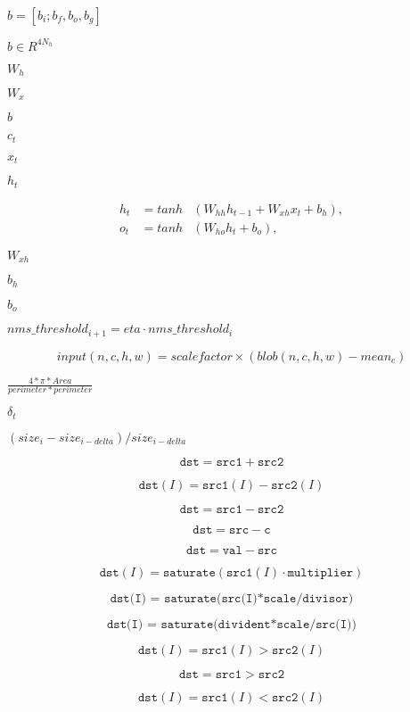 \documentclass{article}
\begin{document}
$ b = [b_i; b_f, b_o, b_g]$
\pagebreak

$b \in R^{4N_h} $
\pagebreak

$ W_h $
\pagebreak

$ W_x $
\pagebreak

$ b $
\pagebreak

$ c_t $
\pagebreak

$ x_t $
\pagebreak

$ h_t $
\pagebreak

\begin{eqnarray*} h_t &= tanh&(W_{hh} h_{t-1} + W_{xh} x_t + b_h), \\ o_t &= tanh&(W_{ho} h_t + b_o), \end{eqnarray*}
\pagebreak

$ W_{xh} $
\pagebreak

$ b_{h} $
\pagebreak

$ b_{o} $
\pagebreak

$nms\_threshold_{i+1}=eta\cdot nms\_threshold_i$
\pagebreak

\[input(n,c,h,w) = scalefactor \times (blob(n,c,h,w) - mean_c)\]
\pagebreak

$\frac{4*\pi*Area}{perimeter * perimeter}$
\pagebreak

$\delta_t$
\pagebreak

$(size_{i}-size_{i-delta})/size_{i-delta}$
\pagebreak

\[\texttt{dst} = \texttt{src1} + \texttt{src2}\]
\pagebreak

\[\texttt{dst}(I) = \texttt{src1}(I) - \texttt{src2}(I)\]
\pagebreak

\[\texttt{dst} = \texttt{src1} - \texttt{src2}\]
\pagebreak

\[\texttt{dst} = \texttt{src} - \texttt{c}\]
\pagebreak

\[\texttt{dst} = \texttt{val} - \texttt{src}\]
\pagebreak

\[\texttt{dst} (I)= \texttt{saturate} ( \texttt{src1} (I) \cdot \texttt{multiplier} )\]
\pagebreak

\[\texttt{dst(I) = saturate(src(I)*scale/divisor)}\]
\pagebreak

\[\texttt{dst(I) = saturate(divident*scale/src(I))}\]
\pagebreak

\[\texttt{dst} (I) = \texttt{src1} (I) > \texttt{src2} (I)\]
\pagebreak

\[\texttt{dst} = \texttt{src1} > \texttt{src2}\]
\pagebreak

\[\texttt{dst} (I) = \texttt{src1} (I) < \texttt{src2} (I)\]
\pagebreak
\end{document}
